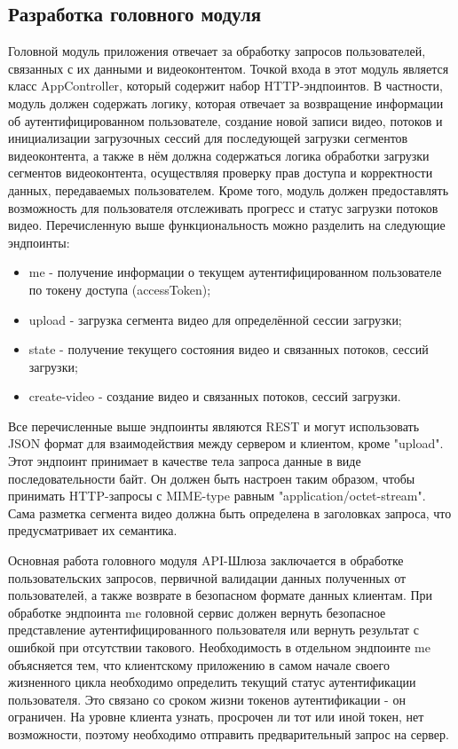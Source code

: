	\subsection{Разработка головного модуля}

	Головной модуль приложения отвечает за обработку запросов пользователей, связанных с их данными и видеоконтентом. Точкой входа в этот модуль является класс AppController, который содержит набор HTTP-эндпоинтов. В частности, модуль должен содержать логику, которая отвечает за возвращение информации об аутентифицированном пользователе, создание новой записи видео, потоков и инициализации загрузочных сессий для последующей загрузки сегментов видеоконтента, а также в нём должна содержаться логика обработки загрузки сегментов видеоконтента, осуществляя проверку прав доступа и корректности данных, передаваемых пользователем. Кроме того, модуль должен предоставлять возможность для пользователя отслеживать прогресс и статус загрузки потоков видео. Перечисленную выше функциональность можно разделить на следующие эндпоинты:

	\begin{itemize}[label=$\bullet$]
		\item me - получение информации о текущем аутентифицированном пользователе по токену доступа (accessToken);
		\item upload - загрузка сегмента видео для определённой сессии загрузки;
		\item state - получение текущего состояния видео и связанных потоков, сессий загрузки;
		\item create-video - создание видео и связанных потоков, сессий загрузки.
	\end{itemize}

	Все перечисленные выше эндпоинты являются REST и могут использовать JSON формат для взаимодействия между сервером и клиентом, кроме "upload". Этот эндпоинт принимает в качестве тела запроса данные в виде последовательности байт. Он должен быть настроен таким образом, чтобы принимать HTTP-запросы с MIME-type равным "application/octet-stream". Сама разметка сегмента видео должна быть определена в заголовках запроса, что предусматривает их семантика.

	Основная работа головного модуля API-Шлюза заключается в обработке пользовательских запросов, первичной валидации данных полученных от пользователей, а также возврате в безопасном формате данных клиентам. При обработке эндпоинта me головной сервис должен вернуть безопасное представление аутентифицированного пользователя или вернуть результат с ошибкой при отсутствии такового. Необходимость в отдельном эндпоинте me объясняется тем, что клиентскому приложению в самом начале своего жизненного цикла необходимо определить текущий статус аутентификации пользователя. Это связано со сроком жизни токенов аутентификации - он ограничен. На уровне клиента узнать, просрочен ли тот или иной токен, нет возможности, поэтому необходимо отправить предварительный запрос на сервер.
	
